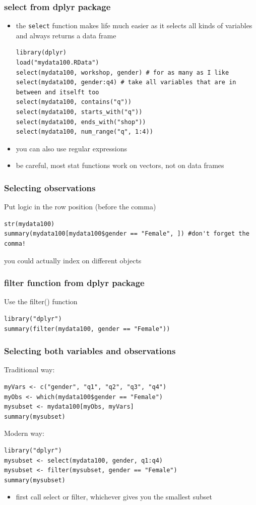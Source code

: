 \documentclass[xcolor={svgnames},10pt,
handout
]{beamer}
\begin{document}
\begin{frame}[fragile]\frametitle{select from dplyr package}
\begin{itemize}
\item the \lstinline|select| function makes life much easier as it selects all kinds of variables and always returns a data frame
\begin{lstlisting}
library(dplyr)
load("mydata100.RData")
select(mydata100, workshop, gender) # for as many as I like
select(mydata100, gender:q4) # take all variables that are in between and itselft too
select(mydata100, contains("q"))
select(mydata100, starts_with("q"))
select(mydata100, ends_with("shop"))
select(mydata100, num_range("q", 1:4))
\end{lstlisting}
\item you can also use regular expressions
\item be careful, most stat functions work on vectors, not on data frames
\end{itemize}
\end{frame}


\begin{frame}[fragile]
\frametitle{Selecting observations}
Put logic in the row position (before the comma)
\begin{lstlisting}
str(mydata100)
summary(mydata100[mydata100$gender == "Female", ]) #don't forget the comma!
\end{lstlisting}
you could actually index on different objects
\end{frame}

\begin{frame}[fragile]
\frametitle{filter function from dplyr package}
Use the filter() function
\begin{lstlisting}
library("dplyr")
summary(filter(mydata100, gender == "Female"))
\end{lstlisting}
\end{frame}

\begin{frame}[fragile]
\frametitle{Selecting both variables and observations}
Traditional way:
\begin{lstlisting}
myVars <- c("gender", "q1", "q2", "q3", "q4")
myObs <- which(mydata100$gender == "Female")
mysubset <- mydata100[myObs, myVars]
summary(mysubset)
\end{lstlisting}
Modern way:
\begin{lstlisting}
library("dplyr")
mysubset <- select(mydata100, gender, q1:q4)
mysubset <- filter(mysubset, gender == "Female")
summary(mysubset)
\end{lstlisting}
\begin{itemize}
\item 
first call select or filter, whichever gives you the smallest subset
\end{itemize}
\end{frame}
\end{document}
